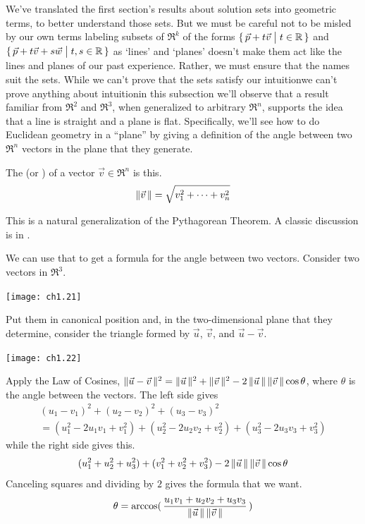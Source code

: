 We've translated the first section's results about solution sets into
geometric terms, to better understand those sets.
But we must be careful not to be misled by our own terms\Dash 
labeling subsets of
\( \Re^k \) of the forms
\( \mbox{$\{\,\vec{p}+t\vec{v}\bigm| t\in\mathbb{R}\,\}$} \) and
\( \mbox{$\{\,\vec{p}+t\vec{v}+s\vec{w}\bigm| t,s\in\mathbb{R}\,\}$} \)
as `lines' and `planes' doesn't make them act like the lines
and planes of our past experience.
Rather, we must ensure that the names suit the sets.
While we can't prove that the sets satisfy our intuition\Dash we can't
prove anything about intuition\Dash in this subsection we'll observe that
a result familiar from \( \Re^2 \) and \( \Re^3 \), when generalized to
arbitrary \( \Re^n \), supports the idea that a line is straight
and a plane is flat.
Specifically, we'll see how to do Euclidean geometry in a ``plane'' by giving
a definition of the angle between two $\Re^n$ vectors in the plane that they
generate.

\begin{definition}
The  
(or )
of a vector
\( \vec{v}\in\Re^n \) is this.
\begin{equation*}
  \|\vec{v}\,\|=\sqrt{v_1^2+\cdots+v_n^2}
\end{equation*}
\end{definition}

\begin{remark}
This is a natural generalization of the Pythagorean Theorem.
A classic discussion is in \cite{MathematicsPlausReason}.
\end{remark}

We can use that to get a formula 
for the angle between two vectors.
Consider two vectors in \( \Re^3 \).
\begin{center}
  \texttt{[image: ch1.21]}
\end{center}
Put them in canonical position
and, in the two-dimensional 
plane that they determine, consider the triangle formed by
\( \vec{u} \), \( \vec{v} \), and \( \vec{u}-\vec{v} \).
\begin{center}
  \texttt{[image: ch1.22]}
\end{center}
Apply the Law of Cosines,
$\|\vec{u}-\vec{v}\,\|^2
  =
  \|\vec{u}\,\|^2+\|\vec{v}\,\|^2-
    2\,\|\vec{u}\,\|\,\|\vec{v}\,\|\cos\theta$, 
where \( \theta \) is the angle between the vectors.
The left side gives 
\begin{multline*}
(u_1-v_1)^2+(u_2-v_2)^2+(u_3-v_3)^2  \\
     =(u_1^2-2u_1v_1+v_1^2)+(u_2^2-2u_2v_2+v_2^2)+(u_3^2-2u_3v_3+v_3^2)
\end{multline*}
while the right side gives this.
\begin{equation*}
(u_1^2+u_2^2+u_3^2)+(v_1^2+v_2^2+v_3^2)-
     2\,\|\vec{u}\,\|\,\|\vec{v}\,\|\cos\theta
\end{equation*}
Canceling squares and dividing by $2$ gives 
the formula that we want.
\begin{equation*}
  \theta
  =
  \arccos(\,\frac{u_1v_1+u_2v_2+u_3v_3}{
         \|\vec{u}\,\|\,\|\vec{v}\,\| }\,)
\end{equation*}

